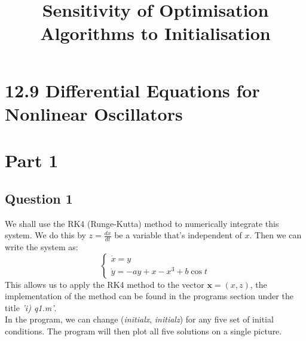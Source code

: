 \documentclass[10pt]{article}
\title{\flushleft2.4 Sensitivity of Optimisation Algorithms to Initialisation\\ }
\date{}
\begin{document}
\hfill{}
\section*{\LARGE{12.9 Differential Equations for Nonlinear Oscillators}}
\section*{Part 1}
\subsection*{Question 1}
We shall use the RK4 (Runge-Kutta) method to numerically integrate this system. We do this by $z=\frac{dx}{dt}$ be a variable that's independent of $x$. Then we can write the system as:
\[\left
\{\begin{array}{lr}
\dot{x}=y\\
\dot{y}=-ay+x-x^3+b\cos t
\end{array}
\right.\]
This allows us to apply the RK4 method to the vector $\bm{x}=(x,z)$, the implementation of the method can be found in the programs section under the title \emph{'i) q1.m'}.\\
In the program, we can change (\textit{initial\textunderscore x}, \textit{initial\textunderscore z}) for any five set of initial conditions. The program will then plot all five solutions on a single picture.
\bigskip\bigskip
\end{document}
